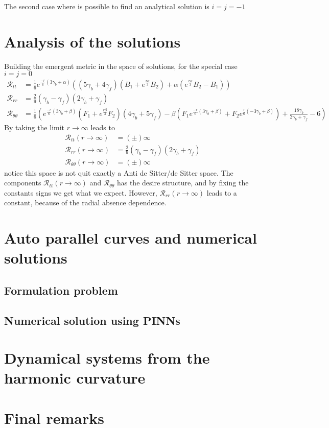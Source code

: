 \documentclass{article}
\begin{document}
The second case where is possible to find an analytical solution is $i = j = -1$



\section{Analysis of the solutions}

Building the emergent metric in the space of solutions, for the special case $ i = j = 0$
\begin{align}
    \mathcal{R}_{tt} & = \frac{1}{6}e^{\frac{-r}{6}\left(3\gamma_b + \alpha\right)}\left(\left(5\gamma_b + 4\gamma_f\right)
    \left(B_1 +e^{\frac{r\alpha}{3}}B_2\right) + \alpha\left(e^{\frac{r\alpha}{3}}B_2 - B_1\right)\right) \\
    \mathcal{R}_{rr} & = \frac{2}{9}\left(\gamma_b - \gamma_f\right)\left(2\gamma_b + \gamma_f\right)\\
    \mathcal{R}_{\theta\theta} & = \frac{1}{6}\left(e^{\frac{-r}{6}\left(3\gamma_b + \beta\right)}\left(F_1 + e^{\frac{r\beta}{3}}F_2\right)\left(4\gamma_b + 5\gamma_f\right) - 
    \beta\left(F_1 e^{\frac{-r}{6}\left(3\gamma_b + \beta\right)} + F_2 e^{\frac{r}{6}\left(-3\gamma_b + \beta\right)}\right) + \frac{18\gamma_b}{2\gamma_b + \gamma_f} - 6\right)
\end{align}
By taking the limit $r \to \infty$ leads to
\begin{align}
    \mathcal{R}_{tt}(r \to \infty) & = (\pm)\infty \\
    \mathcal{R}_{rr}(r \to \infty) & = \frac{2}{9}\left(\gamma_b - \gamma_f\right)\left(2\gamma_b + \gamma_f\right)\\
    \mathcal{R}_{\theta\theta}(r \to \infty) & = (\pm)\infty
\end{align}
notice this space is not quit exactly a Anti de Sitter/de Sitter space. The components $\mathcal{R}_{tt}(r \to \infty)$
and $\mathcal{R}_{\theta\theta}$ has the desire structure, and by fixing the constants signs we get what we expect. However,
$\mathcal{R}_{rr}(r \to \infty)$ leads to a constant, because of the radial absence dependence. 

\section{Auto parallel curves and numerical solutions}

\subsection{Formulation problem}

\subsection{Numerical solution using PINNs}

\section{Dynamical systems from the harmonic curvature}

\section{Final remarks}
\label{sec:final_remarks}



\end{document}
